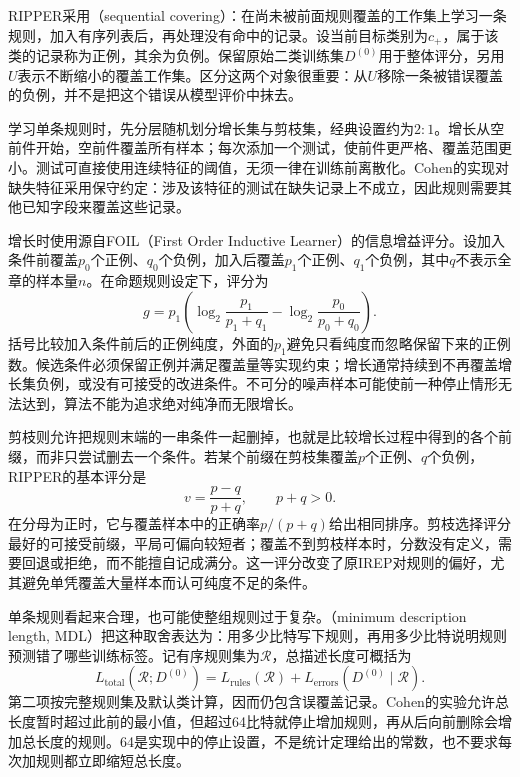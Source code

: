 RIPPER采用（sequential covering）：在尚未被前面规则覆盖的工作集上学习一条规则，加入有序列表后，再处理没有命中的记录。设当前目标类别为$c_+$，属于该类的记录称为正例，其余为负例。保留原始二类训练集$D^{(0)}$用于整体评分，另用$U$表示不断缩小的覆盖工作集。区分这两个对象很重要：从$U$移除一条被错误覆盖的负例，并不是把这个错误从模型评价中抹去。

学习单条规则时，先分层随机划分增长集与剪枝集，经典设置约为$2:1$。增长从空前件开始，空前件覆盖所有样本；每次添加一个测试，使前件更严格、覆盖范围更小。测试可直接使用连续特征的阈值，无须一律在训练前离散化。Cohen的实现对缺失特征采用保守约定：涉及该特征的测试在缺失记录上不成立，因此规则需要其他已知字段来覆盖这些记录。

增长时使用源自FOIL（First Order Inductive Learner）的信息增益评分。设加入条件前覆盖$p_0$个正例、$q_0$个负例，加入后覆盖$p_1$个正例、$q_1$个负例，其中$q$不表示全章的样本量$n$。在命题规则设定下，评分为
\begin{equation}
  g=p_1\left(
  \log_2\frac{p_1}{p_1+q_1}
  -\log_2\frac{p_0}{p_0+q_0}
  \right).
  \label{eq:classification-foil-gain}
\end{equation}
括号比较加入条件前后的正例纯度，外面的$p_1$避免只看纯度而忽略保留下来的正例数。候选条件必须保留正例并满足覆盖量等实现约束；增长通常持续到不再覆盖增长集负例，或没有可接受的改进条件。不可分的噪声样本可能使前一种停止情形无法达到，算法不能为追求绝对纯净而无限增长。

剪枝则允许把规则末端的一串条件一起删掉，也就是比较增长过程中得到的各个前缀，而非只尝试删去一个条件。若某个前缀在剪枝集覆盖$p$个正例、$q$个负例，RIPPER的基本评分是
\begin{equation}
  v=\frac{p-q}{p+q},\qquad p+q>0.
  \label{eq:classification-ripper-pruning}
\end{equation}
在分母为正时，它与覆盖样本中的正确率$p/(p+q)$给出相同排序。剪枝选择评分最好的可接受前缀，平局可偏向较短者；覆盖不到剪枝样本时，分数没有定义，需要回退或拒绝，而不能擅自记成满分。这一评分改变了原IREP对规则的偏好，尤其避免单凭覆盖大量样本而认可纯度不足的条件。

单条规则看起来合理，也可能使整组规则过于复杂。（minimum description length, MDL）把这种取舍表达为：用多少比特写下规则，再用多少比特说明规则预测错了哪些训练标签。记有序规则集为$\mathcal{R}$，总描述长度可概括为
\begin{equation}
  L_{\mathrm{total}}(\mathcal{R};D^{(0)})
  =L_{\mathrm{rules}}(\mathcal{R})
   +L_{\mathrm{errors}}(D^{(0)}\mid\mathcal{R}).
  \label{eq:classification-rule-description-length}
\end{equation}
第二项按完整规则集及默认类计算，因而仍包含误覆盖记录。Cohen的实验允许总长度暂时超过此前的最小值，但超过64比特就停止增加规则，再从后向前删除会增加总长度的规则。64是实现中的停止设置，不是统计定理给出的常数，也不要求每次加规则都立即缩短总长度。

